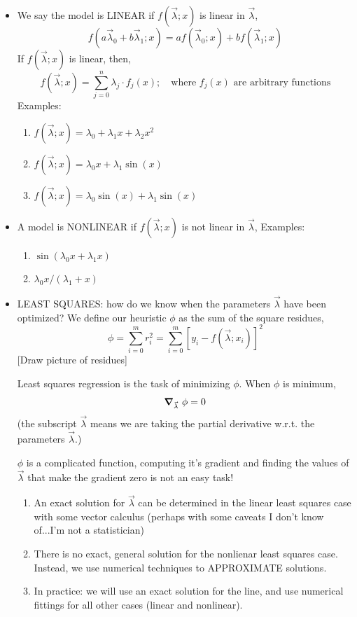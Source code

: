 \documentclass[12pt]{article}
\numberwithin{equation}{section}
\begin{document}
\begin{itemize}
\item We say the model is LINEAR if $ f(\vec{\lambda};x) $ is linear in $ \vec{\lambda} $,
\begin{equation}
		f(a\vec{\lambda}_0+b\vec{\lambda}_1;x) = a f(\vec{\lambda}_0;x) + bf(\vec{\lambda}_1;x) 
\end{equation}
If $ f(\vec{\lambda};x) $ is linear, then,
\begin{equation}
		f(\vec{\lambda};x) = \sum_{j=0}^n \lambda_j \cdot f_j(x);\quad \text{where }f_j(x) \text{ are arbitrary functions}
\end{equation}
Examples:
\begin{enumerate}
	\item $  f(\vec{\lambda};x) = \lambda_0 + \lambda_1 x + \lambda_2 x^2 $
	\item $ f(\vec{\lambda};x) = \lambda_0 x+ \lambda_1 \sin(x) $
	\item $ f(\vec{\lambda};x) = \lambda_0 \sin(x)+ \lambda_1 \sin(x) $
\end{enumerate}
\item A model is NONLINEAR if $ f(\vec{\lambda};x) $ is not linear in $ \vec{\lambda} $,
Examples:
\begin{enumerate}
	\item $ \sin(\lambda_0 x + \lambda_1x)  $
	\item $ \lambda_0 x/(\lambda_1 + x) $
\end{enumerate}
\item LEAST SQUARES: how do we know when the parameters $ \vec{\lambda} $ have been optimized? We define our heuristic $ \phi $ as the sum of the square residues,
\begin{equation}
		\boxed{\phi = \sum_{i=0}^m r_i^2 = \sum_{i=0}^m [y_i - f(\vec{\lambda};x_i)]^2}
\end{equation}
[Draw picture of residues]

Least squares regression is the task of minimizing $ \phi $. When $ \phi $ is minimum,
\begin{equation}
		\grad_{\vec{\lambda}}\  \phi = 0
\end{equation}
(the subscript $ \vec{\lambda} $ means we are taking the partial derivative w.r.t. the parameters $ \vec{\lambda} $.)

$ \phi $ is a complicated function, computing it's gradient and finding the values of $ \vec{\lambda} $ that make the gradient zero is not an easy task!
\begin{enumerate}
	\item An exact solution for $ \vec{\lambda} $ can be determined in the linear least squares case with some vector calculus (perhaps with some caveats I don't know of...I'm not a statistician)
	\item There is no exact, general solution for the nonlienar least squares case. Instead, we use numerical techniques to APPROXIMATE solutions.
	\item In practice: we will use an exact solution for the line, and use numerical fittings for all other cases (linear and nonlinear).
\end{enumerate}


\end{itemize}
\end{document}
